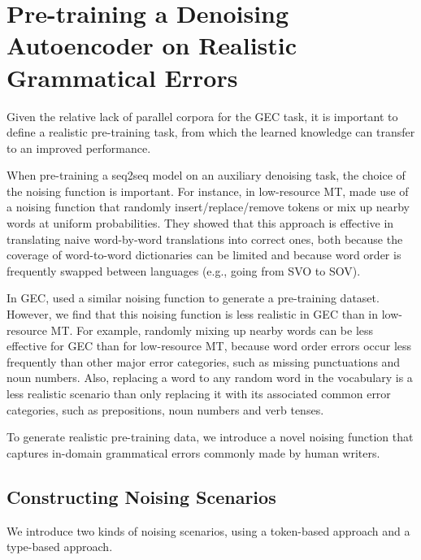 \documentclass[11pt,a4paper]{article}
\begin{document}
\section{Pre-training a Denoising Autoencoder on Realistic Grammatical Errors}\label{sec:pretrain}

Given the relative lack of parallel corpora for the GEC task, it is important to define a realistic pre-training task, from which the learned knowledge can transfer to an improved performance. 

When pre-training a seq2seq model on an auxiliary denoising task, the choice of the noising function is important.
For instance, in low-resource MT, \citet{lample2018unsupervised,lample2018phrase} made use of a noising function that randomly insert/replace/remove tokens or mix up nearby words at uniform probabilities. 
They showed that this approach is effective in translating naive word-by-word translations into correct ones, both because the coverage of word-to-word dictionaries can be limited and because word order is frequently swapped between languages (e.g., going from SVO to SOV). 

In GEC, \citet{zhao2019improving} used a similar noising function to generate a pre-training dataset. 
However, we find that this noising function is less realistic in GEC than in low-resource MT.
For example, randomly mixing up nearby words can be less effective for GEC than for low-resource MT, because word order errors occur less frequently than other major error categories, such as missing punctuations and noun numbers.
Also, replacing a word to any random word in the vocabulary is a less realistic scenario than only replacing it with its associated common error categories, such as prepositions, noun numbers and verb tenses.

To generate realistic pre-training data, we introduce a novel noising function that captures in-domain grammatical errors commonly made by human writers.

\subsection{Constructing Noising Scenarios}\label{sec:noising_scenarios}

We introduce two kinds of noising scenarios, using a token-based approach and a type-based approach.
\end{document}
